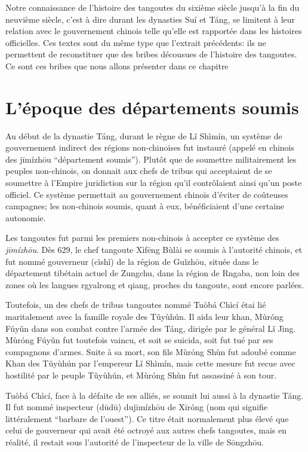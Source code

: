 \documentclass[oldfontcommands,oneside,a4paper,11pt]{memoir}
\newcommand{\ipa}[1]{{\phon #1}} %
\newcommand{\ipapl}[1]{{\phondroit #1}}
\newcommand{\ih}{\v{i}}
\newcommand{\uh}{\v{u}}
\begin{document}
Notre connaissance de l'histoire des tangoutes du sixième siècle jusqu'à la fin du neuvième siècle, c'est à dire durant les dynasties Suí et Táng, se limitent à leur relation avec le gouvernement chinois telle qu'elle est rapportée dans les histoires officielles. Ces textes sont du même type que l'extrait précédents: ils ne permettent de reconstituer que des bribes décousues de l'histoire des tangoutes. Ce sont ces bribes que nous allons présenter dans ce chapitre

\section{L'époque des départements soumis}

Au début de la dynastie Táng, durant le règne de \ipapl{Lǐ} Shìmín, un système de gouvernement indirect des régions non-chinoises fut instauré (appelé en chinois des \ipa{jīmízhōu} ``département soumis''). Plutôt que de soumettre militairement les peuples non-chinois, on donnait aux chefs de tribus qui acceptaient de se soumettre à l'Empire juridiction sur la région qu'il contrôlaient ainsi qu'un poste officiel. Ce système permettait au gouvernement chinois d'éviter de coûteuses campagnes; les non-chinois soumis, quant à eux, bénéficiaient d'une certaine autonomie. 

Les tangoutes fut parmi les premiers non-chinois à accepter ce système des \textit{jīmízhōu}. Dès 629, le chef tangoute Xìfēng Bùlài se soumis à l'autorité chinois, et fut nommé gouverneur (\ipa{cìshǐ}) de la région de \ipapl{Guǐzhōu}, située dans le département tibétain actuel de Zungchu, dans la région de Rngaba, non loin des zones où les langues rgyalrong et qiang, proches du tangoute, sont encore parlées.

Toutefois, un des chefs de tribus tangoutes nommé Tuòbá Chìcí étai lié maritalement avec la famille royale des T\uh{}yùhún. Il aida leur khan, Mùróng Fúy\uh{}n dans son combat contre l'armée des Táng, dirigée par le général L\ih{} Jìng. Mùróng Fúy\uh{}n fut toutefois vaincu, et soit se suicida, soit fut tué par ses compagnons d'armes. Suite à sa mort, son fils Mùróng  Shùn fut adoubé comme Khan des T\uh{}yùhún par l'empereur L\ih{} Shìmín, mais cette mesure fut recue avec hostilité par le peuple T\uh{}yùhún, et Mùróng  Shùn fut assassiné à son tour.

Tuòbá Chìcí, face à la défaite de ses alliés, se soumit lui aussi à la dynastie Táng. Il fut nommé inspecteur (\ipa{dūdū}) du\ipa{jīmízhōu} de Xīróng (nom qui signifie littéralement ``barbare de l'ouest''). Ce titre était normalement plus élevé que celui de gouverneur qui avait été octroyé aux autres chefs tangoutes, mais en réalité, il restait sous l'autorité de l'inspecteur de la ville de Sōngzhōu.
\end{document}
